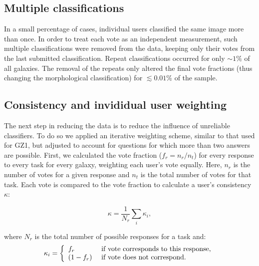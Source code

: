 \documentclass[useAMS,usenatbib]{mn2e}
\begin{document}
\subsection{Multiple classifications}
In a small percentage of cases, individual users classified the same image more than once. In order to treat each vote as an independent measurement, such multiple classifications were removed from the data, keeping only their votes from the last submitted classification. Repeat classifications occurred for only $\sim1\%$ of all galaxies. The removal of the repeats only altered the final vote fractions (thus changing the morphological classification) for $\lesssim0.01\%$ of the sample.  

\subsection{Consistency and invididual user weighting}\label{ssec-consistency}

The next step in reducing the data is to reduce the influence of unreliable classifiers. To do so we applied an iterative weighting scheme, similar to that used for GZ1, but adjusted to account for questions for which more than two answers are possible. First, we calculated the vote fraction ($f_r = n_{r}/n_{t}$) for every response to every task for every galaxy, weighting each user's vote equally. Here, $n_r$ is the number of votes for a given response and $n_{t}$ is the total number of votes for that task. Each vote is compared to the vote fraction to calculate a user's consistency $\kappa$:

\begin{equation}
\kappa = \frac{1}{N_r}\sum_i{\kappa_i},
\label{eqn-consistency}
\end{equation}

where $N_r$ is the total number of possible responses for a task and: 
\begin{equation}
    \kappa_i = \left\{
    \begin{array}{l l}
      f_r       & \text{ if vote corresponds to this response,} \\
      (1 - f_r) & \text{ if vote does not correspond.}\\
    \end{array} \right.
    \label{eqn-consistency2}
 \end{equation}
\end{document}
